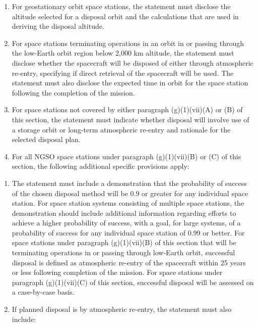 \documentclass[
  letterpaper,
  DIV=11,
  numbers=noendperiod]{scrreport}
\begin{document}
\begin{enumerate}
\def\labelenumi{(\Alph{enumi})}
\item
  For geostationary orbit space stations, the statement must disclose
  the altitude selected for a disposal orbit and the calculations that
  are used in deriving the disposal altitude.
\item
  For space stations terminating operations in an orbit in or passing
  through the low-Earth orbit region below 2,000 km altitude, the
  statement must disclose whether the spacecraft will be disposed of
  either through atmospheric re-entry, specifying if direct retrieval of
  the spacecraft will be used. The statement must also disclose the
  expected time in orbit for the space station following the completion
  of the mission.
\item
  For space stations not covered by either paragraph (g)(1)(vii)(A) or
  (B) of this section, the statement must indicate whether disposal will
  involve use of a storage orbit or long-term atmospheric re-entry and
  rationale for the selected disposal plan.
\item
  For all NGSO space stations under paragraph (g)(1)(vii)(B) or (C) of
  this section, the following additional specific provisions apply:
\end{enumerate}

\begin{enumerate}
\def\labelenumi{(\arabic{enumi})}
\item
  The statement must include a demonstration that the probability of
  success of the chosen disposal method will be 0.9 or greater for any
  individual space station. For space station systems consisting of
  multiple space stations, the demonstration should include additional
  information regarding efforts to achieve a higher probability of
  success, with a goal, for large systems, of a probability of success
  for any individual space station of 0.99 or better. For space stations
  under paragraph (g)(1)(vii)(B) of this section that will be
  terminating operations in or passing through low-Earth orbit,
  successful disposal is defined as atmospheric re-entry of the
  spacecraft within 25 years or less following completion of the
  mission. For space stations under paragraph (g)(1)(vii)(C) of this
  section, successful disposal will be assessed on a case-by-case basis.
\item
  If planned disposal is by atmospheric re-entry, the statement must
  also include:
\end{enumerate}
\end{document}
